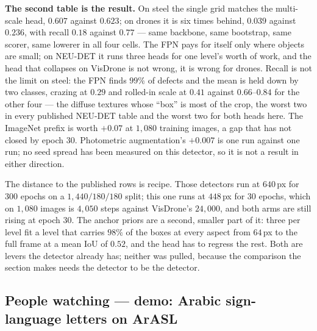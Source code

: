 \noindent \textbf{The second table is the result.} On steel the single grid
matches the multi-scale head, $0.607$ against $0.623$; on drones it is six
times behind, $0.039$ against $0.236$, with recall $0.18$ against $0.77$ ---
same backbone, same bootstrap, same scorer, same lowerer in all four cells.
The FPN pays for itself only where objects are small; on NEU-DET it runs three
heads for one level's worth of work, and the head that collapses on VisDrone
is not wrong, it is wrong for drones. Recall is not the limit on steel:
the FPN finds $99\%$ of defects and the mean is held down by two classes,
crazing at $0.29$ and rolled-in scale at $0.41$ against $0.66$--$0.84$ for the
other four --- the diffuse textures whose ``box'' is most of the crop, the
worst two in every published NEU-DET table and the worst two for both heads
here. The ImageNet prefix is worth $+0.07$ at $1{,}080$ training images, a gap
that has not closed by epoch 30. Photometric augmentation's $+0.007$ is one
run against one run; no seed spread has been measured on this detector, so
it is not a result in either direction.

\medskip\noindent The distance to the published rows is recipe. Those
detectors run at $640$\,px for 300 epochs on a $1{,}440/180/180$ split; this
one runs at $448$\,px for 30 epochs, which on $1{,}080$ images is $4{,}050$
steps against VisDrone's $24{,}000$, and both arms are still rising at epoch
30. The anchor priors are a second, smaller part of it: three per level fit
a level that carries $98\%$ of the boxes at every aspect from $64$\,px to the
full frame at a mean IoU of $0.52$, and the head has to regress the rest.
Both are levers the detector already has; neither was pulled, because the
comparison the section makes needs the detector to be the detector.

\subsection{People watching --- demo: Arabic sign-language letters on ArASL}
\label{sec:bestiary_people}

